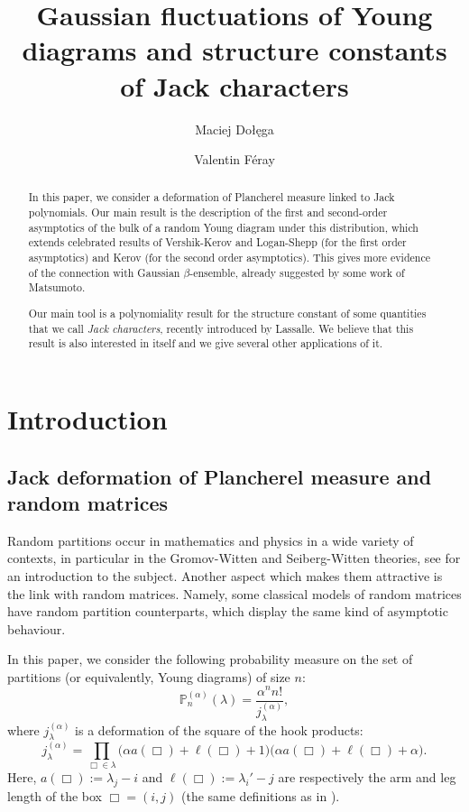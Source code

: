 \documentclass[11pt]{amsart}
\author[M.~Dołęga]{Maciej Dołęga}
\author[V.~Féray]{Valentin Féray}
\title[Large diagrams and structure constants]
{Gaussian fluctuations of Young diagrams and structure constants of Jack characters}
\theoremstyle{plain}
\theoremstyle{remark}
\newcommand{\PP}{\mathbb{P}}
\begin{document}
\maketitle

\begin{abstract}
In this paper, we consider a deformation of Plancherel measure linked to Jack polynomials.
Our main result is the description of the first and second-order asymptotics of the bulk of a random Young diagram under this distribution, which extends celebrated results of Vershik-Kerov and Logan-Shepp (for the first order asymptotics) and Kerov (for the second order asymptotics).
This gives more evidence of the connection with Gaussian $\beta$-ensemble, 
already suggested by some work of Matsumoto.

Our main tool is a polynomiality result for the structure constant of
some quantities that we call {\em Jack characters}, recently introduced by Lassalle.
We believe that this result is also interested in itself and 
we give several other applications of it.
\end{abstract}





\section{Introduction}


\subsection{Jack deformation of Plancherel measure and random matrices}
\label{subsect:JackPlancherel}

Random partitions occur in mathematics and physics in a wide variety of contexts,
in particular in the Gromov-Witten and Seiberg-Witten theories,
see \cite{OkounkovRandomPartitions} for an introduction to the subject.
Another aspect which makes them attractive
is the link with random matrices.
Namely, some classical models of random matrices have random partition counterparts,
which display the same kind of asymptotic behaviour.

In this paper, we consider the following probability measure
on the set of partitions (or equivalently, Young diagrams) of size $n$:
\begin{equation}
\label{eq:JackMeasure}
\PP_n^{(\alpha)} ( \lambda ) = \frac{\alpha^n n!}{j_\lambda^{(\alpha)}},
\end{equation}
where $j_\lambda^{(\alpha)}$ is a deformation of the square of the
hook products:
\[j_\lambda^{(\alpha)} = \prod_{\Box \in \lambda} \bigg(\alpha a(\Box) + \ell(\Box)
+1\bigg)
\bigg(\alpha a(\Box) + \ell(\Box)+\alpha\bigg).\]
Here, $a(\Box) := \lambda_j - i$ and $\ell(\Box) := \lambda_i' - j$ are respectively the arm and leg length
of the box $\Box = (i,j)$ (the same definitions as in \cite[Chapter I]{Macdonald1995}).
\end{document}
